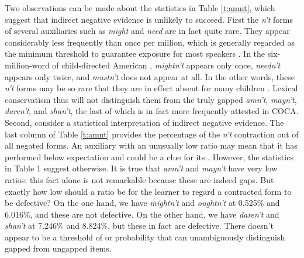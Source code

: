 \documentclass[output=paper,
modfonts
]{LSP/langsci}
\begin{document}
Two observations can be made about the  statistics in Table
\ref{t:amnt}, which suggest that  indirect negative evidence is unlikely to
succeed.   First  the \textit{n't} forms of several auxiliaries such as \textit{might} and \textit{need} are in fact quite rare. They appear
considerably less frequently than  once per million,  which is
generally regarded as the minimum  
threshold to guarantee exposure for most  speakers
\citep{Nagy1984}. In the  six-million-word  of child-directed
American  \citep{CHILDES}, \textit{mightn't} appears only once,
\textit{needn't} appears only twice, and \textit{
  mustn't} does not appear at all. In the other words, these \textit{n't}
forms may be so rare 
that they are in effect absent for many children
\citep{Hart1995}. Lexical conservatism thus will not 
distinguish them 
from the truly gapped \textit{amn't}, \textit{mayn't}, \textit{daren't}, and \textit{shan't}, the last of which is in fact more
frequently attested in COCA. Second, consider a statistical interpretation of
indirect negative evidence. The last column of Table
\ref{t:amnt} provides the percentage of the 
\textit{n't} contraction out of all negated forms. 
An auxiliary with  an unusually low
ratio may mean  that it has performed below expectation and 
could be a clue for its . However, the statistics in Table
1 suggest otherwise. It is true that \textit{amn't} and \textit{mayn't} have very low ratios:  this fact alone is not remarkable
because these are indeed gaps. But exactly how low should a
ratio be for the learner to regard a contracted form to be
defective? On the one hand, we have \textit{mightn't} and \textit{oughtn't}
at 0.525\% and 6.016\%, and these are not defective. On the
other hand, we have \textit{
  daren't} and \textit{shan't} at 7.246\% and 8.824\%, but these in fact are
 defective.  There doesn't appear to
be a threshold of  or probability that can unambiguously
distinguish gapped from ungapped items. 
\end{document}
